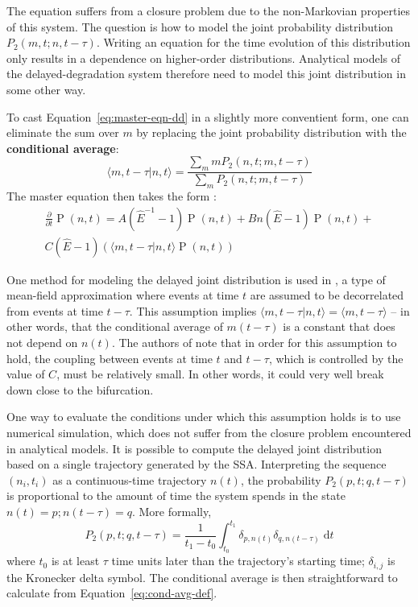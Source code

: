 \documentclass[english,letterpaper,12pt]{report}
\newcommand{\defkeywd}[1]{\textbf{#1}}
\newcommand{\dee}{\;\mathrm{d}}
\DeclareMathOperator{\Prob}{P}
\begin{document}
\begin{doublespacing}
The equation suffers from a closure problem due to the non-Markovian properties of this system. The question is how to model the joint probability distribution $P_2(m,t; n, t - \tau)$. Writing an equation for the time evolution of this distribution only results in a dependence on higher-order distributions. Analytical models of the delayed-degradation system therefore need to model this joint distribution in some other way.

To cast Equation~\eqref{eq:master-eqn-dd} in a slightly more conventient form, one can eliminate the sum over $m$ by replacing the joint probability distribution with the \defkeywd{conditional average}:
\begin{equation}
    \langle m, t - \tau | n, t \rangle = \frac{\sum_m m P_2(n, t; m, t - \tau)}{\sum_m P_2(n, t; m, t - \tau) }
    \label{eq:cond-avg-def}
\end{equation}
The master equation then takes the form \cite{delayed-deg-notes}:
\begin{multline}
    \frac{\partial}{\partial t} \Prob(n, t) = A(\hat{E}^{-1} - 1) \Prob(n, t) + B n(\hat{E} - 1) \Prob(n, t) + \\
    C (\hat{E} - 1) (\langle m, t - \tau | n, t \rangle \Prob(n, t))
    \label{eq:master-eqn-dd-ca}
\end{multline}

One method for modeling the delayed joint distribution is used in \cite{delay-oscillations}, a type of mean-field approximation where events at time $t$ are assumed to be decorrelated from events at time $t - \tau$. This assumption implies $\langle m, t - \tau | n, t \rangle = \langle m, t - \tau \rangle$ -- in other words, that the conditional average of $m(t - \tau)$ is a constant that does not depend on $n(t)$. The authors of \cite{delay-oscillations} note that in order for this assumption to hold, the coupling between events at time $t$ and $t - \tau$, which is controlled by the value of $C$, must be relatively small. In other words, it could very well break down close to the bifurcation.

One way to evaluate the conditions under which this assumption holds is to use numerical simulation, which does not suffer from the closure problem encountered in analytical models. It is possible to compute the delayed joint distribution based on a single trajectory generated by the SSA. Interpreting the sequence $(n_i, t_i)$ as a continuous-time trajectory $n(t)$, the probability $P_2(p, t; q, t - \tau)$ is proportional to the amount of time the system spends in the state $n(t) = p; n(t - \tau) = q$. More formally,
\begin{equation}
    P_2(p, t; q, t - \tau) = \frac{1}{t_1 - t_0} \int_{t_0}^{t_1} \delta_{p, n(t)} \delta_{q, n(t - \tau)} \dee t
    \label{eq:joint-pdist-calc}
\end{equation}
where $t_0$ is at least $\tau$ time units later than the trajectory's starting time; $\delta_{i,j}$ is the Kronecker delta symbol. The conditional average is then straightforward to calculate from Equation~\eqref{eq:cond-avg-def}.


\end{doublespacing}
\end{document}
